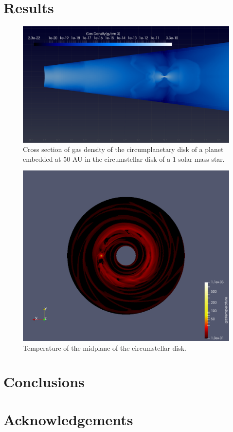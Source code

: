 \documentclass[twocolumn]{aastex62}
\begin{document}
\section{Results}\label{sec:res}
\begin{figure}
	\centering
	\includegraphics[width=0.9\linewidth]{figures/Dens5YCut0Zoom.png}
	\caption{\label{fig:dens} Cross section of gas density of the circumplanetary disk of a planet embedded at 50 AU in the circumstellar disk of a 1 solar mass star.}
\end{figure}
\begin{figure}
	\centering
	\includegraphics[width=0.9\linewidth]{figures/Temp/GasTempMidplane.png}
	\caption{\label{fig:temp} Temperature of the midplane of the circumstellar disk.}
\end{figure}
\section{Conclusions}\label{sec:con}
\section{Acknowledgements}
\end{document}
